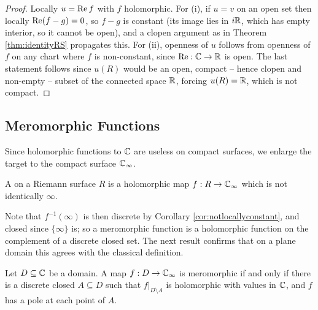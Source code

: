 \documentclass[a4paper]{scrartcl}
\newcommand{\Cinf}{\C_\infty}
\begin{document}
\begin{proof}
	Locally $u = \operatorname{Re} f$ with $f$ holomorphic. For (i), if $u = v$ on an open set then
	locally $\operatorname{Re}(f - g) = 0$, so $f - g$ is constant (its image lies in $i\mathbb{R}$, which has
	empty interior, so it cannot be open), and a clopen argument as in Theorem
	\ref{thm:identityRS} propagates this. For (ii), openness of $u$ follows from openness of
	$f$ on any chart where $f$ is non-constant, since $\operatorname{Re} : \mathbb{C} \to \mathbb{R}$ is open. The last
	statement follows since $u(R)$ would be an open, compact -- hence clopen and non-empty
	-- subset of the connected space $\mathbb{R}$, forcing $u(R) = \mathbb{R}$, which is not compact.
\end{proof}

\subsection{Meromorphic Functions}

Since holomorphic functions to $\mathbb{C}$ are useless on compact surfaces, we enlarge the target
to the compact surface $\Cinf$.

\begin{definition}
	A  on a Riemann surface $R$ is a holomorphic map
	$f : R \to \Cinf$ which is not identically $\infty$.
\end{definition}

Note that $f^{-1}(\infty)$ is then discrete by Corollary \ref{cor:notlocallyconstant}, and
closed since $\{\infty\}$ is; so a meromorphic function is a holomorphic function on the
complement of a discrete closed set. The next result confirms that on a plane domain this
agrees with the classical definition.

\begin{proposition}\label{prop:meroplane}
	Let $D \subseteq \mathbb{C}$ be a domain. A map $f : D \to \Cinf$ is meromorphic if and only if
	there is a discrete closed $A \subseteq D$ such that $f|_{D\setminus A}$ is holomorphic
	with values in $\mathbb{C}$, and $f$ has a pole at each point of $A$.
\end{proposition}
\end{document}
